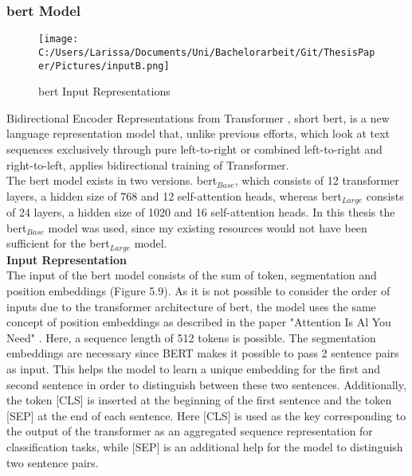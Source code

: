 \documentclass[a4paper, 11pt,titlepage,oneside,openany]{book}
\begin{document}
\subsubsection{\gls{bert} Model}
\begin{figure}[h]
	\centering
	\texttt{[image: C:/Users/Larissa/Documents/Uni/Bachelorarbeit/Git/ThesisPaper/Pictures/inputB.png]}
	\caption{\gls{bert} Input Representations \cite{bert}}
\end{figure}
Bidirectional Encoder Representations from Transformer \cite{bert}, short \gls{bert}, is a new language representation model that, unlike previous efforts, which look at text sequences exclusively through pure left-to-right or combined left-to-right and right-to-left, applies bidirectional training of Transformer. \\
\noindent The \gls{bert} model exists in two versions. \gls{bert}$_{Base}$, which consists of 12 transformer layers, a hidden size of 768 and 12 self-attention heads, whereas \gls{bert}$_{Large}$ consists of 24 layers, a hidden size of 1020 and 16 self-attention heads. In this thesis the \gls{bert}$_{Base}$ model was used, since my existing resources would not have been sufficient for the \gls{bert}$_{Large}$ model.\\

\noindent \textbf{Input Representation} \\
\indent The input of the \gls{bert} model consists of the sum of token, segmentation and position embeddings (Figure 5.9). As it is not possible to consider the order of inputs due to the transformer architecture of \gls{bert}, the model uses the same concept of position embeddings as described in the paper "Attention Is Al You Need" \cite{attention}. Here, a sequence length of 512 tokens is possible. The segmentation embeddings are necessary since BERT makes it possible to pass 2 sentence pairs as input. This helps the model to learn a unique embedding for the first and second sentence in order to distinguish between these two sentences.  Additionally, the token [CLS] is inserted at the beginning of the first sentence and the token [SEP] at the end of each sentence. Here [CLS] is used as the key corresponding to the output of the transformer as an aggregated sequence representation for classification tasks, while [SEP] is an additional help for the model to distinguish two sentence pairs.\\
\end{document}
